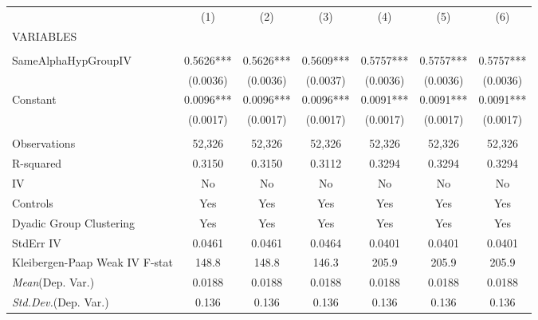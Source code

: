 \documentclass[]{article}
\begin{document}
\begin{tabular}{lcccccc} \hline
 & (1) & (2) & (3) & (4) & (5) & (6) \\
VARIABLES &  &  &  &  &  &  \\ \hline
 &  &  &  &  &  &  \\
SameAlphaHypGroupIV & 0.5626*** & 0.5626*** & 0.5609*** & 0.5757*** & 0.5757*** & 0.5757*** \\
 & (0.0036) & (0.0036) & (0.0037) & (0.0036) & (0.0036) & (0.0036) \\
Constant & 0.0096*** & 0.0096*** & 0.0096*** & 0.0091*** & 0.0091*** & 0.0091*** \\
 & (0.0017) & (0.0017) & (0.0017) & (0.0017) & (0.0017) & (0.0017) \\
 &  &  &  &  &  &  \\
Observations & 52,326 & 52,326 & 52,326 & 52,326 & 52,326 & 52,326 \\
R-squared & 0.3150 & 0.3150 & 0.3112 & 0.3294 & 0.3294 & 0.3294 \\
IV & No & No & No & No & No & No \\
Controls & Yes & Yes & Yes & Yes & Yes & Yes \\
Dyadic Group Clustering & Yes & Yes & Yes & Yes & Yes & Yes \\
StdErr IV & 0.0461 & 0.0461 & 0.0464 & 0.0401 & 0.0401 & 0.0401 \\
Kleibergen-Paap Weak IV F-stat & 148.8 & 148.8 & 146.3 & 205.9 & 205.9 & 205.9 \\
\textit{Mean}(Dep. Var.) & 0.0188 & 0.0188 & 0.0188 & 0.0188 & 0.0188 & 0.0188 \\
 \textit{Std.Dev.}(Dep. Var.) & 0.136 & 0.136 & 0.136 & 0.136 & 0.136 & 0.136 \\ \hline
\end{tabular}
\end{document}
